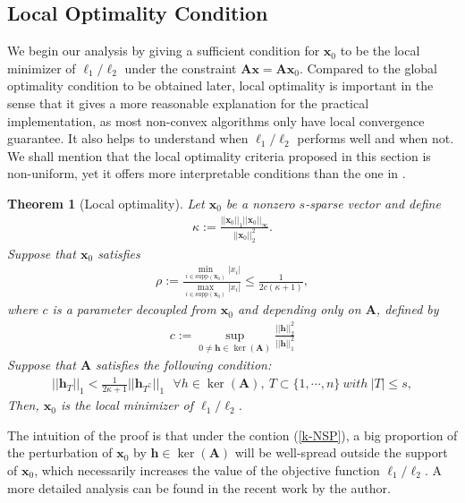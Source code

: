 \documentclass[11pt]{article}
\numberwithin{equation}{section}
\theoremstyle{plain}
\newtheorem{Th}{Theorem}[section]
\theoremstyle{definition}
\def\A{{\mathbf A}}
\def\x{{\mathbf x}}
\def\h{{\mathbf{h}}}
\begin{document}
\subsection{Local Optimality Condition}

We begin our analysis by giving a sufficient condition for $\x_0$ to be the local minimizer of $\ell_1/\ell_2$ under the constraint $\A\x=\A\x_0$. Compared to the global optimality condition to be obtained later, local optimality is important in the sense that it gives a more reasonable explanation for the practical implementation, as most non-convex algorithms only have local convergence guarantee. It also helps to understand when $\ell_1/\ell_2$ performs well and when not. We shall mention that the local optimality criteria proposed in this section is non-uniform, yet it offers more interpretable conditions than the one in \cite{rahimi2018scale}.

\begin{Th}[Local optimality]\label{T:local}
Let $\x_0$ be a nonzero $s$-sparse vector and define
\begin{align}
\kappa:=\frac{||\x_0||_1||\x_0||_\infty}{||\x_0||^2_2}.\label{kappa}
\end{align}
Suppose that $\x_0$ satisfies  
\begin{align}
\rho:=\frac{\min_{i\in\text{supp}(\x_0)}|x_i|}{\max_{i\in\text{supp}(\x_0)}|x_i|}\leq\frac{1}{2c(\kappa+1)},\label{ratio}
\end{align}
where $c$ is a parameter decoupled from $\x_0$ and depending only on $\A$, defined by 
\begin{align*}
c:=\sup_{0\neq \h\in\ker(\A)}\frac{||\h||^2_2}{||\h||_1^2}
\end{align*}
Suppose that $\A$ satisfies the following condition: 
\begin{align}
||\h_T||_1<\frac{1}{2\kappa+1}||\h_{T^\complement}||_1\ \ \ \forall h\in\ker(\A), \ T\subset\{1, \cdots, n\}\ with\ |T|\leq s,\label{k-NSP}
\end{align}
Then, $\x_0$ is the local minimizer of $\ell_1/\ell_2$.   
\end{Th}


The intuition of the proof is that under the contion (\ref{k-NSP}), a big proportion of the perturbation of $\x_0$ by $\h\in\ker(\A)$ will be well-spread outside the support of $\x_0$, which necessarily increases the value of the objective function $\ell_1/\ell_2$. A more detailed analysis can be found in the recent work by the author. 
\end{document}
